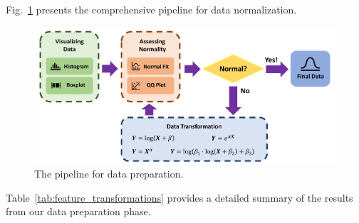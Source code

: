 \documentclass{article}
\begin{document}
	Fig.~\ref{data_prep} presents the comprehensive pipeline for data normalization.
	\begin{figure}
		\centering
		\includegraphics[width=\textwidth]{graphs/prepare_data.pdf}
		\caption{The pipeline for data preparation.}
		\label{data_prep}
	\end{figure}
	
	Table~\ref{tab:feature_transformations} provides a detailed summary of the results from our data preparation phase.
	
\end{document}
